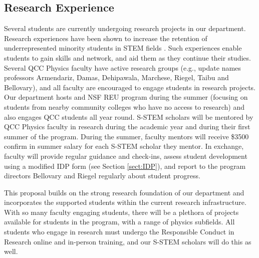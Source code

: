 \documentclass[12pt]{article}
\newcommand\new[1]{{\color{blue}#1}}
\begin{document}
\subsection{\normalsize{Research Experience}}
\vspace{-2mm}
Several students are currently undergoing research projects in our department.  Research experiences have been shown to increase the retention of underrepresented minority students in STEM fields \citep{Graham,Russell}.   Such experiences  enable students to gain skills and network, and aid them as they continue their studies.  Several QCC Physics faculty have active research groups (e.g., \new{update names} professors Armendariz, Damas, Dehipawala, Marchese, Riegel, Taibu and Bellovary), and all faculty are encouraged to engage students in research projects.  Our department hosts and NSF REU program during the summer (focusing on students from nearby community colleges who have no access to research) and also engages QCC students all year round.  S-STEM scholars will be mentored by QCC Physics faculty in research during the academic year and during their first summer of the program.  During the summer, faculty mentors will receive \$3500 \new{confirm} in summer salary for each S-STEM scholar they mentor.  In exchange, faculty will provide regular guidance and check-ins, assess student development using a modified IDP form (see Section \ref{sect:IDP}), and report to the program directors Bellovary and Riegel regularly about student progress.  

This proposal builds on the strong research foundation of our department and incorporates the supported students within the current research infrastructure.  With so many faculty engaging students, there will be a plethora of projects available for students in the program, with a range of physics subfields.  All students who engage in research must undergo the Responsible Conduct in Research online and in-person training, and our S-STEM scholars will do this as well.
\vspace{-5mm}
\end{document}
